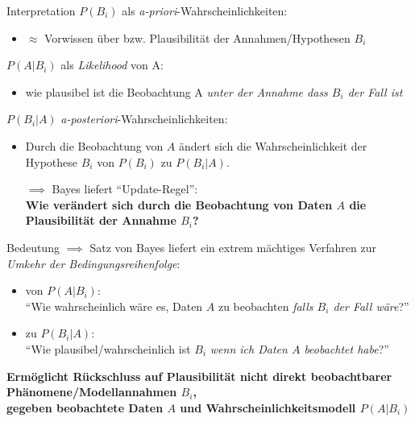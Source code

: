 \documentclass[
  10pt,
  ignorenonframetext,
]{beamer}
\providecommand{\tightlist}{%
  \setlength{\itemsep}{0pt}\setlength{\parskip}{0pt}}
\begin{document}
\begin{frame}{Interpretation}
\protect\hypertarget{interpretation}{}
\(P(B_i)\) als \emph{a-priori}-Wahrscheinlichkeiten:

\begin{itemize}
\tightlist
\item
  \(\approx\) Vorwissen über bzw. Plausibilität der Annahmen/Hypothesen
  \(B_i\)
\end{itemize}

\(P(A|B_i)\) als \emph{Likelihood} von A:

\begin{itemize}
\tightlist
\item
  wie plausibel ist die Beobachtung A \emph{unter der Annahme dass
  \(B_i\) der Fall ist}
\end{itemize}

\(P(B_i|A)\) \emph{a-posteriori}-Wahrscheinlichkeiten:

\begin{itemize}
\item
  Durch die Beobachtung von \(A\) ändert sich die Wahrscheinlichkeit der
  Hypothese \(B_i\) von \(P(B_i)\) zu \(P(B_i|A).\)

  \(\implies\) Bayes liefert ``Update-Regel'':\\
  \textbf{Wie verändert sich durch die Beobachtung von Daten \(A\) die
  Plausibilität der Annahme \(B_i\)?}
\end{itemize}
\end{frame}

\begin{frame}{Bedeutung}
\protect\hypertarget{bedeutung}{}
\(\implies\) Satz von Bayes liefert ein extrem mächtiges Verfahren zur\\
\emph{Umkehr der Bedingungsreihenfolge}:

\begin{itemize}
\tightlist
\item
  von \(P(A|B_i)\):\\
  ``Wie wahrscheinlich wäre es, Daten \(A\) zu beobachten \emph{falls
  \(B_i\) der Fall wäre}?''
\item
  zu \(P(B_i|A)\):\\
  ``Wie plausibel/wahrscheinlich ist \(B_i\) \emph{wenn ich Daten \(A\)
  beobachtet habe}?''
\end{itemize}

\textbf{Ermöglicht Rückschluss auf Plausibilität nicht direkt
beobachtbarer Phänomene/Modellannahmen \(B_i\),\\
gegeben beobachtete Daten \(A\) und Wahrscheinlichkeitsmodell
\(P(A|B_i)\)}

\end{frame}
\end{document}
